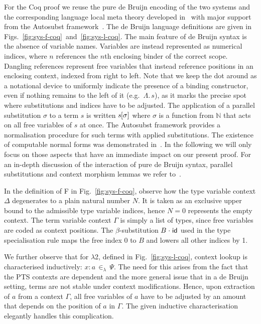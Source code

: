 \documentclass[a4paper,UKenglish]{lipics-v2016}
\newcommand{\ms}{\,}
\newcommand{\mrel}[1]{\mathrel{\ms #1 \ms}}
\newcommand{\Nat}{\mathbb{N}}
\newcommand{\SysL}{$\lambda$2\xspace}
\newcommand{\of}{\ensuremath{\!:\!}}
\newcommand{\inL}{\mrel{\in_{\lambda}}}
\newcommand{\TyLam}{\ensuremath{\Lambda.\,}}
\newcommand{\subst}[1]{\hphantom{|}\!\![{#1}]}
\newcommand{\scons}{\mathbin{\hspace{0.05em}\cdot\hspace{0.05em}}}
\newcommand{\id}{\mathsf{id}}
\theoremstyle{plain}
\begin{document}
For the Coq proof we reuse the pure de Bruijn encoding of the two systems and the corresponding language local meta theory developed in~\cite{KaiserEtAl:2017:sysf_pts_equiv_coq} with major support from the Autosubst framework~\cite{DBLP:conf/itp/SchaferTS15}.
The de Bruijn language definitions are given in Figs.~\ref{fig:sys-f-coq}~and~\ref{fig:sys-l-coq}.
The main feature of de Bruijn syntax is the absence of variable names.
Variables are instead represented as numerical indices, where $n$ references the $n$th enclosing binder of the correct scope.
Dangling references represent free variables that instead reference positions in an enclosing context, indexed from right to left.
Note that we keep the dot around as a notational device to uniformly indicate the presence of a binding constructor, even if nothing remains to the left of it (e.g.\ $\TyLam s$), as it marks the precise spot where substitutions and indices have to be adjusted.
The application of a parallel substitution $\sigma$ to a term $s$ is written $s\subst{\sigma}$ where $\sigma$ is a function from $\Nat$ that acts on all free variables of $s$ at once.
The Autosubst framework provides a normalisation procedure for such terms with applied substitutions.
The existence of computable normal forms was demonstrated in~\cite{SchaeferEtAl:2009:Completeness}.
In the following we will only focus on those aspects that have an immediate impact on our present proof.
For an in-depth discussion of the interaction of pure de Bruijn syntax, parallel substitutions and context morphism lemmas we refer to~\cite{deBruijn1972, SchaeferEtAl:2009:Completeness, DBLP:conf/itp/SchaferTS15, abadi1991, GoguenMcKinna1997, KaiserEtAl:2017:sysf_pts_equiv_coq}.

In the definition of F in Fig.~\ref{fig:sys-f-coq}, observe how the type variable context $\Delta$ degenerates to a plain natural number $N$.
It is taken as an exclusive upper bound to the admissible type variable indices, hence $N = 0$ represents the empty context.
The term variable context $\Gamma$ is simply a list of types, since free variables are coded as context positions.
The $\beta$-substitution $B\scons{\id}$ used in the type specialisation rule maps the free index 0 to $B$ and lowers all other indices by 1.

We further observe that for \SysL, defined in Fig.~\ref{fig:sys-l-coq}, context lookup is characterised inductively: $x \of a \inL \Psi$.
The need for this arises from the fact that the PTS contexts are dependent and the more general issue that in a de Bruijn setting, terms are not stable under context modifications.
Hence, upon extraction of $a$ from a context $\Gamma$, all free variables of $a$ have to be adjusted by an amount that depends on the position of $a$ in $\Gamma$.
The given inductive characterisation elegantly handles this complication.
\end{document}

